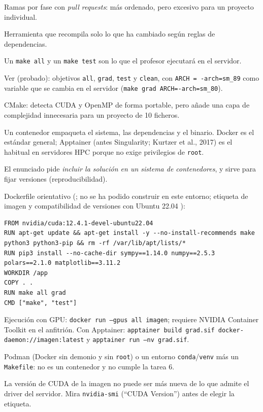 \alt Ramas por fase con \emph{pull requests}: más ordenado, pero excesivo para un proyecto individual.

\que Herramienta que recompila solo lo que ha cambiado según reglas de dependencias.

\porque Un \texttt{make all} y un \texttt{make test} son lo que el profesor ejecutará en el servidor.

\como Ver  (probado): objetivos \texttt{all}, \texttt{grad}, \texttt{test} y \texttt{clean}, con \texttt{ARCH = -arch=sm\_89} como variable que se cambia en el servidor (\texttt{make grad ARCH=-arch=sm\_80}).

\alt CMake: detecta CUDA y OpenMP de forma portable, pero añade una capa de complejidad innecesaria para un proyecto de 10 ficheros.

\que Un contenedor empaqueta el sistema, las dependencias y el binario. Docker es el estándar general; Apptainer (antes Singularity; Kurtzer et al., 2017) es el habitual en servidores HPC porque no exige privilegios de \texttt{root}.

\porque El enunciado pide \emph{incluir la solución en un sistema de contenedores}, y sirve para fijar versiones (reproducibilidad).

\como Dockerfile orientativo (; no se ha podido construir en este entorno; etiqueta de imagen y compatibilidad de versiones con Ubuntu 22.04 \pv):
\begin{lstlisting}
FROM nvidia/cuda:12.4.1-devel-ubuntu22.04
RUN apt-get update && apt-get install -y --no-install-recommends make python3 python3-pip && rm -rf /var/lib/apt/lists/*
RUN pip3 install --no-cache-dir sympy==1.14.0 numpy==2.5.3 polars==2.1.0 matplotlib==3.11.2
WORKDIR /app
COPY . .
RUN make all grad
CMD ["make", "test"]
\end{lstlisting}
Ejecución con GPU: \texttt{docker run --gpus all imagen}; requiere NVIDIA Container Toolkit en el anfitrión. Con Apptainer: \texttt{apptainer build grad.sif docker-daemon://imagen:latest} y \texttt{apptainer run --nv grad.sif}.

\alt Podman (Docker sin demonio y sin \texttt{root}) o un entorno \texttt{conda}/\texttt{venv} más un \texttt{Makefile}: no es un contenedor y no cumple la tarea 6.

\begin{trampa}
La versión de CUDA de la imagen no puede ser más nueva de lo que admite el driver del servidor. Mira \texttt{nvidia-smi} (``CUDA Version'') antes de elegir la etiqueta.
\end{trampa}

